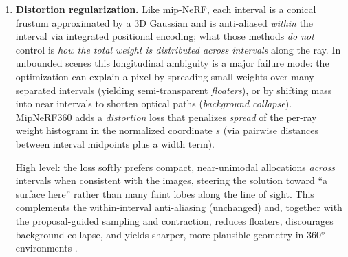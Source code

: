 \begin{enrichment}
\begin{enrichment}
\begin{enumerate}
            \noindent\emph{Why this improves things:}
            \begin{itemize}
                \item The proposal amortizes search, so the final intervals rapidly cluster near actual surfaces instead of being wasted in empty space.
                \item The NeRF MLP avoids redundant coarse-and-fine rendering passes, enabling higher capacity without prohibitive training cost.
                \item The consistency term keeps proposals conservative (they must cover what NeRF uses), reducing missed surfaces and aliasing in unbounded scenes.
            \end{itemize}
            
            \item \textbf{Distortion regularization.} Like mip-NeRF, each interval is a conical frustum approximated by a 3D Gaussian and is anti-aliased \emph{within} the interval via integrated positional encoding; what those methods \emph{do not} control is \emph{how the total weight is distributed \emph{across} intervals} along the ray. In unbounded scenes this longitudinal ambiguity is a major failure mode: the optimization can explain a pixel by spreading small weights over many separated intervals (yielding semi-transparent \emph{floaters}), or by shifting mass into near intervals to shorten optical paths (\emph{background collapse}). MipNeRF360 \cite{barron2022_mipnerf360} adds a \emph{distortion} loss that penalizes \emph{spread} of the per-ray weight histogram in the normalized coordinate \(s\) (via pairwise distances between interval midpoints plus a width term). 
            
            \newpage
            
            High level: the loss softly prefers compact, near-unimodal allocations \emph{across} intervals when consistent with the images, steering the solution toward “a surface here” rather than many faint lobes along the line of sight. This complements the within-interval anti-aliasing (unchanged) and, together with the proposal-guided sampling and contraction, reduces floaters, discourages background collapse, and yields sharper, more plausible geometry in 360° environments \cite{barron2022_mipnerf360}.
            
        \end{enumerate}
        

\end{enrichment}
\end{enrichment}
